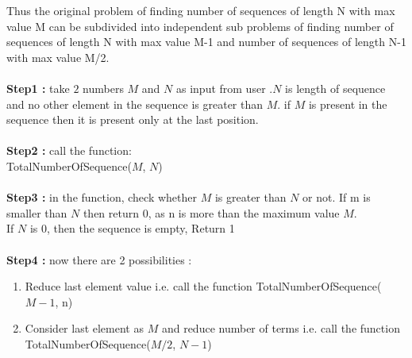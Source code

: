 \documentclass[conference]{IEEEtran}
\begin{document}
Thus the original problem of finding number of sequences of length N with max value M can be subdivided into independent sub problems of finding number of sequences of length N with max value M-1 and number of sequences of length N-1 with max value M/2.\\
\\\textbf{Step1 :}
take \begin{math}
2\end{math} numbers \begin{math}
M\end{math} and \begin{math}
N\end{math} as input from user .\begin{math}
N\end{math} is length of sequence and no other element in the sequence is greater than \begin{math}
M\end{math}. if \begin{math}
M\end{math} is present in the sequence then it is present only at the last position. 
\\\\\textbf{Step2 :}
call the function:\\ 
TotalNumberOfSequence(\begin{math}
M\end{math}, \begin{math}
N\end{math})
\\\\\textbf{Step3 :}
in the function, check whether \begin{math}M\end{math} is greater than \begin{math}N\end{math} or not. If m is smaller than \begin{math}N\end{math} then return 0, as  n is more than the maximum value \begin{math}
M\end{math}.\\
If \begin{math}N\end{math} is 0, then the sequence is empty,  Return 1
\\\\\textbf{Step4 :}
now there are 2 possibilities :
\begin{enumerate}
    \item Reduce  last element value i.e. call the function TotalNumberOfSequence(\begin{math}
M-1\end{math}, n)
    \item Consider last element as \begin{math}M\end{math} and reduce number of terms i.e. call the function TotalNumberOfSequence(\begin{math}
M/2\end{math}, \begin{math}N-1\end{math})
\end{enumerate}
\end{document}
